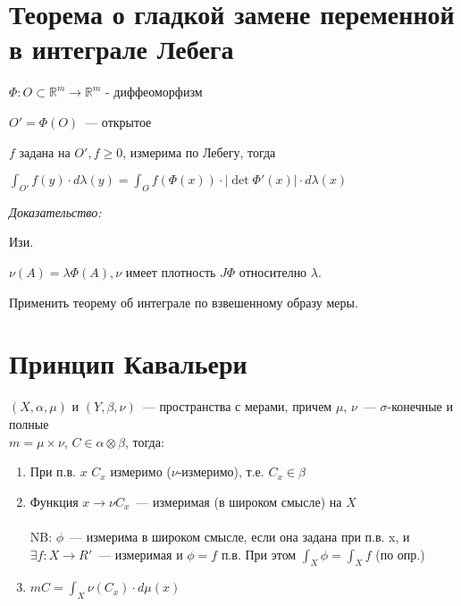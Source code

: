 \documentclass[paper=a4, fontsize=14pt]{report}
\begin{document}
\section{Теорема о гладкой замене переменной в интеграле Лебега}
$\Phi: O \subset \mathds{R}^m \rightarrow \mathds{R}^m$ - диффеоморфизм

$O' = \Phi(O)$~--- открытое

$f$ задана на $O', f \geqslant 0$, измерима по Лебегу, тогда

$\int_{O'}f(y) \cdot d \lambda(y) = \int_O f(\Phi(x)) \cdot |\det \Phi'(x)| \cdot d \lambda(x)$


\emph{Доказательство:}

Изи.

$\nu(A) = \lambda \Phi (A), \nu$ имеет плотность $J \Phi$ относително $\lambda$.

Применить теорему об интеграле по взвешенному образу меры.


\section{Принцип Кавальери}
	$(X, \alpha, \mu)$ и $(Y, \beta, \nu)$~--- пространства с мерами, причем $\mu$, $\nu$~--- $\sigma$-конечные и полные\\
	$m = \mu \times \nu$, $C \in \alpha\otimes\beta$, тогда:\\
	\begin{enumerate}
		\item
		При п.в. $x$ $C_x$ измеримо ($\nu$-измеримо), т.е. $C_x \in \beta$
		\item
		Функция $x \rightarrow \nu C_x$~--- измеримая (в широком смысле) на $X$\\ \\
		NB: $\phi$~--- измерима в широком смысле, если она задана при п.в. x, и $\exists f : X \rightarrow R'$~--- измеримая и $\phi = f$ п.в. При этом $\int_X \phi = \int_X f$ (по опр.)
		\item
		$m C = \int_X \nu(C_x) \cdot d\mu(x)$
	\end{enumerate}
	
\end{document}
